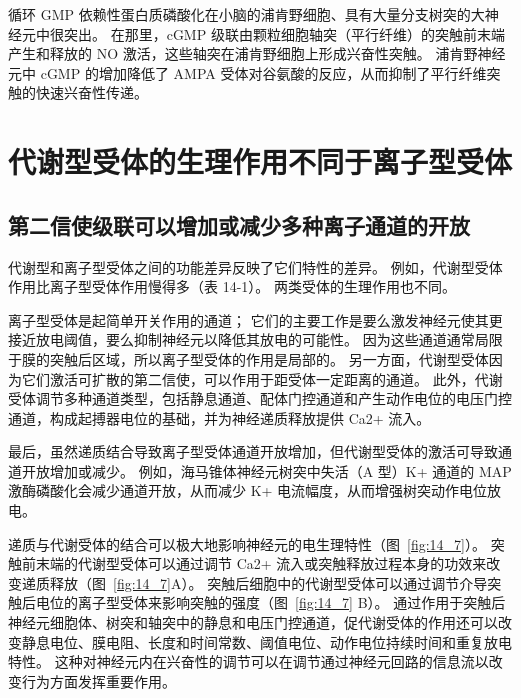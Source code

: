 循环 GMP 依赖性蛋白质磷酸化在小脑的浦肯野细胞、具有大量分支树突的大神经元中很突出。
在那里，cGMP 级联由颗粒细胞轴突（平行纤维）的突触前末端产生和释放的 NO 激活，这些轴突在浦肯野细胞上形成兴奋性突触。
浦肯野神经元中 cGMP 的增加降低了 AMPA 受体对谷氨酸的反应，从而抑制了平行纤维突触的快速兴奋性传递。



\section{代谢型受体的生理作用不同于离子型受体}

\subsection{第二信使级联可以增加或减少多种离子通道的开放}

代谢型和离子型受体之间的功能差异反映了它们特性的差异。
例如，代谢型受体作用比离子型受体作用慢得多（表 14-1）。
两类受体的生理作用也不同。


离子型受体是起简单开关作用的通道；
它们的主要工作是要么激发神经元使其更接近放电阈值，要么抑制神经元以降低其放电的可能性。
因为这些通道通常局限于膜的突触后区域，所以离子型受体的作用是局部的。
另一方面，代谢型受体因为它们激活可扩散的第二信使，可以作用于距受体一定距离的通道。
此外，代谢受体调节多种通道类型，包括静息通道、配体门控通道和产生动作电位的电压门控通道，构成起搏器电位的基础，并为神经递质释放提供 Ca2+ 流入。


最后，虽然递质结合导致离子型受体通道开放增加，但代谢型受体的激活可导致通道开放增加或减少。
例如，海马锥体神经元树突中失活（A 型）K+ 通道的 MAP 激酶磷酸化会减少通道开放，从而减少 K+ 电流幅度，从而增强树突动作电位放电。


递质与代谢受体的结合可以极大地影响神经元的电生理特性（图~\ref{fig:14_7}）。
突触前末端的代谢型受体可以通过调节 Ca2+ 流入或突触释放过程本身的功效来改变递质释放（图~\ref{fig:14_7}A）。
突触后细胞中的代谢型受体可以通过调节介导突触后电位的离子型受体来影响突触的强度（图~\ref{fig:14_7} B）。
通过作用于突触后神经元细胞体、树突和轴突中的静息和电压门控通道，促代谢受体的作用还可以改变静息电位、膜电阻、长度和时间常数、阈值电位、动作电位持续时间和重复放电特性。
这种对神经元内在兴奋性的调节可以在调节通过神经元回路的信息流以改变行为方面发挥重要作用。


